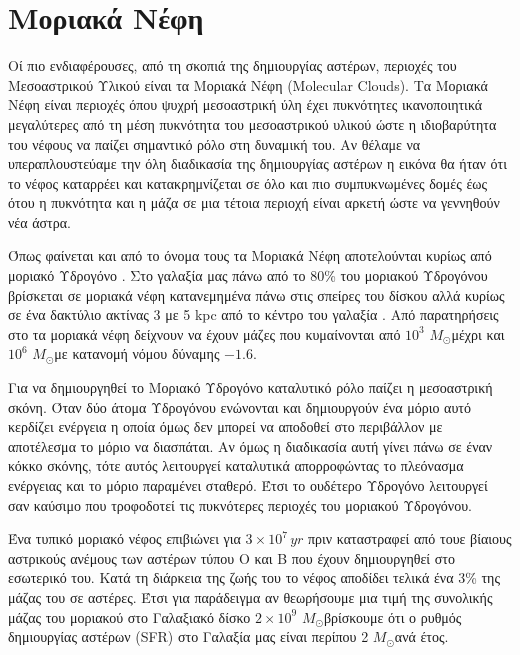\documentclass[a4paper,11pt]{memoir}
\newcommand{\sm}{$M_{\odot}$}
\begin{document}
	
\section{Μοριακά Νέφη}
Οί πιο ενδιαφέρουσες, από τη σκοπιά της δημιουργίας αστέρων, περιοχές του Μεσοαστρικού Υλικού είναι τα Μοριακά Νέφη (Molecular Clouds).
Τα Μοριακά Νέφη είναι περιοχές όπου ψυχρή μεσοαστρική ύλη έχει πυκνότητες ικανοποιητικά μεγαλύτερες  από τη μέση πυκνότητα του μεσοαστρικού υλικού ώστε η ιδιοβαρύτητα του νέφους να παίζει σημαντικό ρόλο στη δυναμική του. 
Αν θέλαμε να υπεραπλουστεύαμε την όλη διαδικασία της δημιουργίας αστέρων η εικόνα θα ήταν ότι το νέφος καταρρέει και κατακρημνίζεται σε όλο και πιο συμπυκνωμένες δομές έως ότου η πυκνότητα και η μάζα σε μια τέτοια περιοχή είναι αρκετή ώστε να γεννηθούν νέα άστρα.   

Όπως φαίνεται και από το όνομα τους τα Μοριακά Νέφη αποτελούνται κυρίως από μοριακό Υδρογόνο . Στο γαλαξία μας πάνω από το 80\% του μοριακού Υδρογόνου βρίσκεται σε μοριακά νέφη κατανεμημένα πάνω στις σπείρες του δίσκου αλλά κυρίως σε ένα δακτύλιο ακτίνας 3 με 5 kpc από το κέντρο του γαλαξία .  Από παρατηρήσεις στο  τα μοριακά νέφη δείχνουν να έχουν μάζες που κυμαίνονται από $10^3$ \sm μέχρι και $10^6$ \sm με κατανομή νόμου δύναμης $-1.6$. \cite{stahlern_2004}

Για να δημιουργηθεί το Μοριακό Υδρογόνο καταλυτικό ρόλο παίζει η μεσοαστρική σκόνη.  Όταν δύο άτομα Υδρογόνου ενώνονται και δημιουργούν ένα μόριο  αυτό κερδίζει ενέργεια η οποία όμως δεν μπορεί να αποδοθεί στο περιβάλλον με αποτέλεσμα το μόριο να διασπάται. Αν όμως η διαδικασία αυτή γίνει πάνω σε έναν κόκκο σκόνης, τότε αυτός λειτουργεί καταλυτικά απορροφώντας το πλεόνασμα ενέργειας και το μόριο παραμένει σταθερό. Έτσι το ουδέτερο Υδρογόνο λειτουργεί σαν καύσιμο που τροφοδοτεί τις πυκνότερες περιοχές του μοριακού Υδρογόνου. 

Ένα τυπικό μοριακό νέφος επιβιώνει για $3\times 10^7 \, yr$ πριν καταστραφεί από τουε βίαιους αστρικούς ανέμους των αστέρων τύπου O και B που έχουν δημιουργηθεί στο εσωτερικό του. Κατά τη διάρκεια της ζωής του το νέφος αποδίδει τελικά ένα 3\% της μάζας του σε αστέρες. Έτσι για παράδειγμα αν θεωρήσουμε μια τιμή της συνολικής μάζας του μοριακού  στο Γαλαξιακό δίσκο $2\times 10^9$ \sm βρίσκουμε ότι ο ρυθμός δημιουργίας αστέρων (SFR) στο Γαλαξία μας είναι περίπου 2 \sm ανά έτος.  
\end{document}
